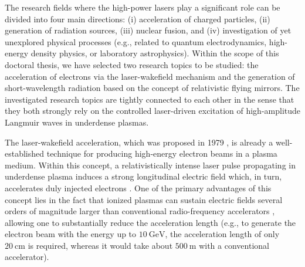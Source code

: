 \documentclass[10pt, a4paper, twoside, openright]{report}
\begin{document}
The research fields where the high-power lasers play a significant role can be divided into four main directions: (i) acceleration of charged particles, (ii) generation of radiation sources, (iii) nuclear fusion, and (iv) investigation of yet unexplored physical processes (e.g., related to quantum electrodynamics, high-energy density physics, or laboratory astrophysics). Within the scope of this doctoral thesis, we have selected two research topics to be studied: the acceleration of electrons via the laser-wakefield mechanism and the generation of short-wavelength radiation based on the concept of relativistic flying mirrors. The investigated research topics are tightly connected to each other in the sense that they both strongly rely on the controlled laser-driven excitation of high-amplitude Langmuir waves in underdense plasmas.

The laser-wakefield acceleration, which was proposed in 1979 \cite{Tajima1979}, is already a well-established technique for producing high-energy electron beams in a plasma medium. Within this concept, a relativistically intense laser pulse propagating in underdense plasma induces a strong longitudinal electric field which, in turn, accelerates duly injected electrons \cite{Esarey1996, Esarey2009, Hooker2013, Bulanov2016}. One of the primary advantages of this concept lies in the fact that ionized plasmas can sustain electric fields several orders of magnitude larger than conventional radio-frequency accelerators \cite{Dawson1959}, allowing one to substantially reduce the acceleration length (e.g., to generate the electron beam with the energy up to $ 10 \ \mathrm{GeV} $, the acceleration length of only $ 20 \ \mathrm{cm} $ is required, whereas it would take about $ 500 \ \mathrm{m} $ with a conventional accelerator).
\end{document}
